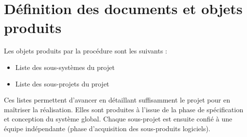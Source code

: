 \section{Définition des documents et objets produits}

Les objets produits par la procédure sont les suivants :

\begin{itemize}
\item Liste des sous-systèmes du projet
\item Liste des sous-projets du projet
\end{itemize}

Ces listes permettent d'avancer en détaillant suffisamment le projet pour en maîtriser
la réalisation. Elles sont produites à l'issue de la phase de spécification
et conception du système global. Chaque sous-projet est ensuite confié à
une équipe indépendante (phase d'acquisition des sous-produits logiciels).
